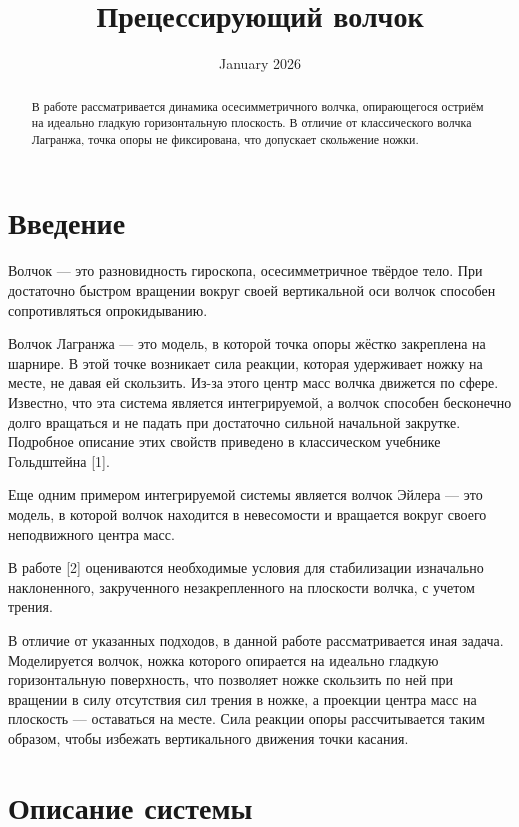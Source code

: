 \documentclass{article}
\title{Прецессирующий волчок}
\date{January 2026}
\begin{document}
\maketitle

\begin{abstract}
В работе рассматривается динамика осесимметричного волчка, опирающегося остриём на идеально гладкую горизонтальную плоскость. 
В отличие от классического волчка Лагранжа, точка опоры не фиксирована, что допускает скольжение ножки. 
\end{abstract}

\section{Введение}

Волчок --- это разновидность гироскопа, осесимметричное твёрдое тело. 
При достаточно быстром вращении вокруг своей вертикальной оси волчок способен сопротивляться опрокидыванию.

Волчок Лагранжа --- это модель, в которой точка опоры жёстко закреплена на шарнире. 
В этой точке возникает сила реакции, которая удерживает ножку на месте, не давая ей скользить. 
Из-за этого центр масс волчка движется по сфере. 
Известно, что эта система является интегрируемой, а волчок способен бесконечно долго вращаться и не падать при достаточно сильной начальной закрутке. 
Подробное описание этих свойств приведено в классическом учебнике Гольдштейна [1].

Еще одним примером интегрируемой системы является волчок Эйлера --- это модель, в которой волчок находится в невесомости и вращается вокруг своего неподвижного центра масс.

 В работе [2] оцениваются необходимые условия для стабилизации изначально наклоненного, закрученного незакрепленного на плоскости волчка, с учетом трения. 

В отличие от указанных подходов, в данной работе рассматривается иная задача. 
Моделируется волчок, ножка которого опирается на идеально гладкую горизонтальную поверхность, что позволяет ножке скользить по ней при вращении в силу отсутствия сил трения в ножке, а проекции центра масс на плоскость --- оставаться на месте. 
Сила реакции опоры рассчитывается таким образом, чтобы избежать вертикального движения точки касания. 

\section{Описание системы}
\end{document}
